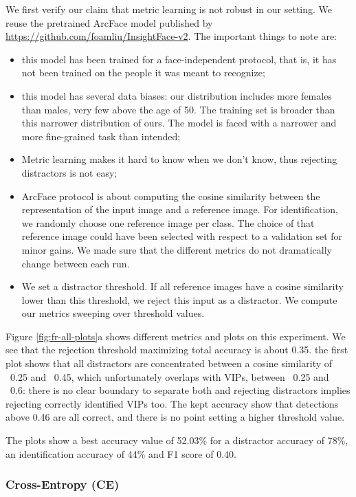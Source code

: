 We first verify our claim that metric learning is not robust in our setting. We reuse the pretrained ArcFace model published by \url{https://github.com/foamliu/InsightFace-v2}. The important things to note are:

\begin{itemize}
    \item this model has been trained for a face-independent protocol, that is, it has not been trained on the people it was meant to recognize;
    \item this model has several data biases: our distribution includes more females than males, very few above the age of 50. The training set is broader than this narrower distribution of ours. The model is faced with a narrower and more fine-grained task than intended;
    \item Metric learning makes it hard to know when we don't know, thus rejecting distractors is not easy;
    \item ArcFace protocol is about computing the cosine similarity between the representation of the input image and a reference image. For identification, we randomly choose one reference image per class. The choice of that reference image could have been selected with respect to a validation set for minor gains. We made sure that the different metrics do not dramatically change between each run.
    \item We set a distractor threshold. If all reference images have a cosine similarity lower than this threshold, we reject this input as a distractor. We compute our metrics sweeping over threshold values.
\end{itemize}

Figure \ref{fig:fr-all-plots}a shows different metrics and plots on this experiment. We see that the rejection threshold maximizing total accuracy is about 0.35. the first plot shows that all distractors are concentrated between a cosine similarity of ~0.25 and ~0.45, which unfortunately overlaps with VIPs, between ~0.25 and ~0.6: there is no clear boundary to separate both and rejecting distractors implies rejecting correctly identified VIPs too. The kept accuracy show that detections above 0.46 are all correct, and there is no point setting a higher threshold value.

The plots show a best accuracy value of 52.03\% for a distractor accuracy of 78\%, an identification accuracy of 44\% and F1 score of 0.40.

\subsubsection{Cross-Entropy (CE)}

